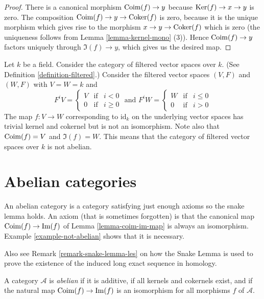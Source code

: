 \begin{proof}
There is a canonical morphism $\mathop{\mathrm{Coim}}(f) \to
y$
because $\mathop{\mathrm{Ker}}(f) \to x \to y$ is zero.
The composition $\mathop{\mathrm{Coim}}(f) \to y \to
\mathop{\mathrm{Coker}}(f)$
is zero, because it is the unique morphism
which gives
rise to the morphism $x \to y \to \mathop{\mathrm{Coker}}(f)$
which
is zero
(the uniqueness follows from
Lemma \ref{lemma-kernel-mono} (3)).
Hence $\mathop{\mathrm{Coim}}(f) \to y$ factors uniquely
through
$\Im(f) \to y$, which gives us the desired
map.
\end{proof}

\begin{example}
\label{example-not-abelian}
Let $k$ be a field.
Consider the category
of filtered vector spaces over $k$.
(See Definition \ref{definition-filtered}.)
Consider the filtered vector spaces $(V, F)$
and $(W, F)$ with
$V = W = k$ and
$$
F^iV
=
\left\{
\begin{matrix}
V & \text{if} & i < 0 \\
0 & \text{if} & i \geq 0
\end{matrix}
\right.
\text{ and }
F^iW
=
\left\{
\begin{matrix}
W & \text{if} & i \leq 0 \\
0 & \text{if} & i > 0
\end{matrix}
\right.
$$
The map $f : V \to W$ corresponding to
$\text{id}_k$ on the underlying
vector spaces has trivial kernel and cokernel
but is not
an isomorphism. Note also that $\mathop{\mathrm{Coim}}(f) = V$
and $\Im(f) = W$.
This means that the category of filtered
vector spaces over $k$
is not abelian.
\end{example}





\section{Abelian categories}
\label{section-abelian-categories}

\noindent
An abelian category is a category satisfying
just enough axioms so the
snake lemma holds. An axiom (that is
sometimes forgotten)
is that the canonical map $\mathop{\mathrm{Coim}}(f) \to
\mathop{\mathrm{Im}}(f)$
of Lemma \ref{lemma-coim-im-map} is always an
isomorphism.
Example \ref{example-not-abelian} shows that
it is necessary.

Also see Remark \ref{remark-snake-lemma-les}
on how the Snake Lemma is used
to prove the existence of the
induced long exact sequence
in homology.

\begin{definition}
\label{definition-abelian-category}
A category $\mathcal{A}$ is {\it abelian} if
it is additive, if all kernels and cokernels
exist,
and if the natural map $\mathop{\mathrm{Coim}}(f) \to \mathop{\mathrm{Im}}(f)$
is an isomorphism for all morphisms $f$ of
$\mathcal{A}$.
\end{definition}

